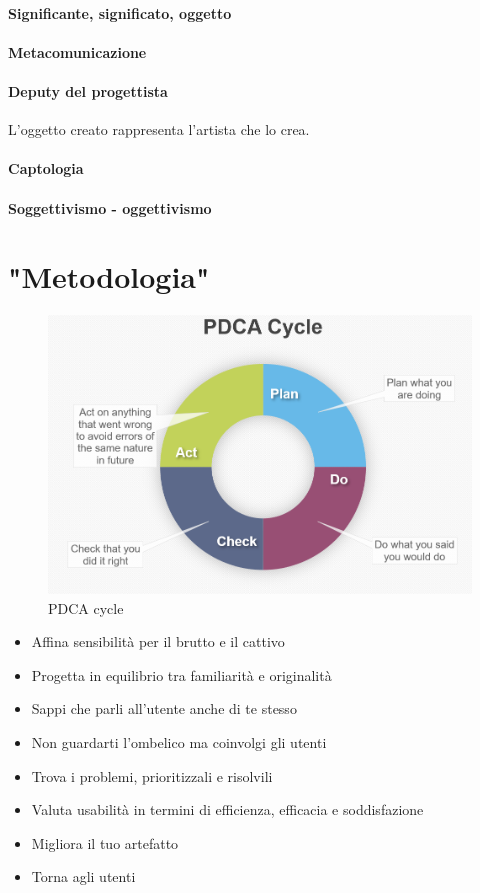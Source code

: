 \documentclass[11pt,a4paper]{book}
\begin{document}
\paragraph{Significante, significato, oggetto}


\paragraph{Metacomunicazione}


\paragraph{Deputy del progettista}
L'oggetto creato rappresenta l'artista che lo crea.

\paragraph{Captologia}


\paragraph{Soggettivismo - oggettivismo}


\section{"Metodologia"}
\begin{figure}[h!]
	\begin{center}
		\includegraphics[scale=0.6]{img/011.png}
		\caption{PDCA cycle}
		\label{fig: 011}
	\end{center}
\end{figure}
\begin{itemize}
	\item Affina sensibilità per il brutto e il cattivo
	\item Progetta in equilibrio tra familiarità e originalità
	\item Sappi che parli all'utente anche di te stesso
	\item Non guardarti l'ombelico ma coinvolgi gli utenti
	\item Trova i problemi, prioritizzali e risolvili
	\item Valuta usabilità in termini di efficienza, efficacia e soddisfazione
	\item Migliora il tuo artefatto
	\item Torna agli utenti
\end{itemize}
\end{document}
